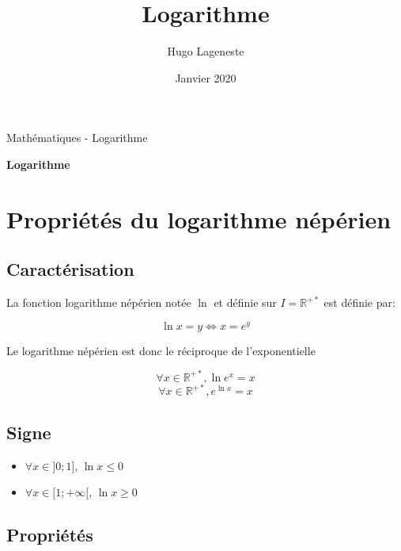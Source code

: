 \documentclass[a4paper]{article}
\title{Logarithme}
\author{Hugo Lageneste}
\date{Janvier 2020}
\begin{document}
{Mathématiques - Logarithme}

\begin{center}
 \newcommand{\HRule}{\rule{\linewidth}{0.5mm}}
 {\huge \bfseries Logarithme}\\[0.1cm]
\end{center}

\section{Propriétés du logarithme népérien}
\subsection{Caractérisation}

{La fonction logarithme népérien notée $\ln{}$ et définie sur $I=\mathbb{R}^{+*}$ est définie par:}

\[\ln{x}=y \Leftrightarrow x=e^y\]

{Le logarithme népérien est donc le réciproque de l'exponentielle}

\[\forall x \in \mathbb{R}^{+*}, \ln{e^x}=x\]
\[\forall x \in \mathbb{R}^{+*}, e^{\ln{x}}=x\]

\subsection{Signe}

\begin{multicols}{2}
	\begin{itemize}
  		\item{$\forall x \in ]0;1]$, $\ln{x} \leqslant 0$}
  		\item{$\forall x \in [1;+\infty[$, $\ln{x} \geqslant 0$}
	\end{itemize}
\end{multicols}

\begin{center}
\end{center}

\subsection{Propriétés}
\end{document}
